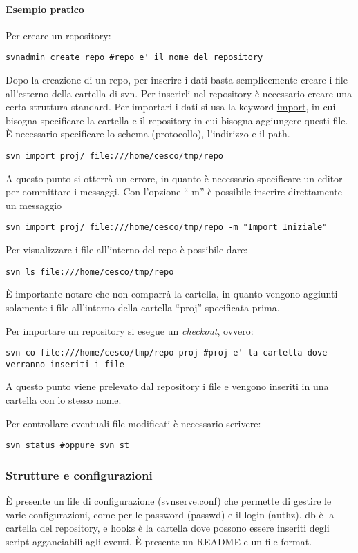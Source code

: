 \paragraph*{Esempio pratico}Per creare un repository:
\begin{verbatim}
svnadmin create repo #repo e' il nome del repository
\end{verbatim}
Dopo la creazione di un repo, per inserire i dati basta semplicemente creare i file all'esterno della cartella di svn. Per inserirli nel repository \`e necessario creare una certa struttura standard. Per importari i dati si usa la keyword \underline{import}, in cui bisogna specificare la cartella e il repository in cui bisogna aggiungere questi file. \`E necessario specificare lo schema (protocollo), l'indirizzo e il path.
\begin{verbatim}
svn import proj/ file:///home/cesco/tmp/repo
\end{verbatim}
A questo punto si otterr\`a un errore, in quanto \`e necessario specificare un editor per committare i messaggi. Con l'opzione ``-m'' \`e possibile inserire direttamente un messaggio
\begin{verbatim}
svn import proj/ file:///home/cesco/tmp/repo -m "Import Iniziale"
\end{verbatim}
Per visualizzare i file all'interno del repo \`e possibile dare:
\begin{verbatim}
svn ls file:///home/cesco/tmp/repo
\end{verbatim}
\`E importante notare che non comparr\`a la cartella, in quanto vengono aggiunti solamente i file all'interno della cartella ``proj'' specificata prima.

Per importare un repository si esegue un \textit{checkout}, ovvero:
\begin{verbatim}
svn co file:///home/cesco/tmp/repo proj #proj e' la cartella dove verranno inseriti i file
\end{verbatim}
A questo punto viene prelevato dal repository i file e vengono inseriti in una cartella con lo stesso nome.

Per controllare eventuali file modificati \`e necessario scrivere:
\begin{verbatim}
svn status #oppure svn st
\end{verbatim}

\subsubsection{Strutture e configurazioni}

\`E presente un file di configurazione (svnserve.conf) che permette di gestire le varie configurazioni, come per le password (passwd) e il login (authz). db \`e la cartella del repository, e hooks \`e la cartella dove possono essere inseriti degli script agganciabili agli eventi. \`E presente un README e un file format.
